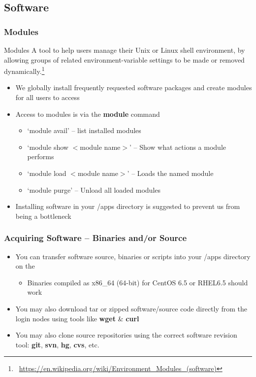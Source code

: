\subsection{Software}
\begin{frame}
	\frametitle{Modules}
	\begin{block}{Modules}\tiny
	  A tool to help users manage their Unix or Linux shell environment, by allowing groups of related environment-variable settings to be made or removed dynamically.\footnote{\label{wiki_module}\tiny\
             \url{https://en.wikipedia.org/wiki/Environment_Modules_(software)}}
	
	\end{block}
	\begin{itemize}
		\item We globally install frequently requested software packages and create modules for all users to access
		\item Access to modules is via the \textbf{module} command
		\begin{itemize}\footnotesize
			\item `module avail' -- list installed modules
			\item `module show $<$module name$>$' -- Show what actions a module performs
			\item `module load $<$module name$>$' -- Loads the named module
			\item `module purge' -- Unload all loaded modules
		\end{itemize}
		\item Installing software in your \ctilde{}/apps directory is suggested to prevent us from being a bottleneck
	\end{itemize}

\end{frame}


\begin{frame}
	\frametitle{Acquiring Software -- Binaries and/or Source}
	\begin{itemize}
		\item	You can transfer software source, binaries or scripts into your \ctilde{}/apps directory on the {\craycs}
		\begin{itemize}
			\item Binaries compiled as x86\_64 (64-bit) for CentOS 6.5 or RHEL6.5 should work
		\end{itemize}
		\item You may also download tar or zipped software/source code directly from the login nodes using tools like \textbf{wget} \& \textbf{curl}
		\item You may also clone source repositories using the correct software revision tool: \textbf{git}, \textbf{svn}, \textbf{hg}, \textbf{cvs}, etc.
	\end{itemize}
\end{frame}


